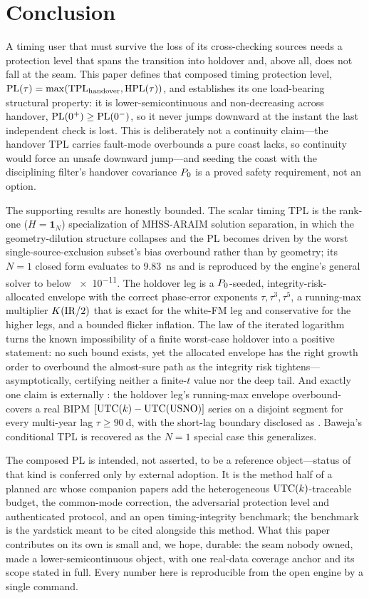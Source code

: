 \section{Conclusion}
\label{sec:conclusion}

A timing user that must survive the loss of its cross-checking sources needs a
protection level that spans the transition into holdover and, above all, does not
fall at the seam. This paper defines that composed timing protection level,
$\mathrm{PL}(\tau)=\max(\mathrm{TPL}_{\mathrm{handover}},\mathrm{HPL}(\tau))$, and establishes its one
load-bearing structural property: it is lower-semicontinuous and non-decreasing
across handover, $\mathrm{PL}(0^{+})\ge\mathrm{PL}(0^{-})$, so it never jumps downward at the
instant the last independent check is lost. This is deliberately not a continuity
claim---the handover TPL carries fault-mode overbounds a pure coast lacks, so
continuity would force an unsafe downward jump---and seeding the coast with the
disciplining filter's handover covariance $P_0$ is a proved safety requirement,
not an option.

The supporting results are honestly bounded. The scalar timing TPL is the rank-one
($H=\bm 1_N$) specialization of MHSS-ARAIM solution separation, in which the
geometry-dilution structure collapses and the PL becomes driven by the worst
single-source-exclusion subset's bias overbound rather than by geometry; its $N=1$
closed form evaluates to \SI{9.83}{\nano\second} and is reproduced by the engine's
general solver to below \num{e-11}. The holdover leg is a $P_0$-seeded,
integrity-risk-allocated envelope with the correct phase-error exponents
$\tau,\tau^{3},\tau^{5}$, a running-max multiplier $K(\mathrm{IR}/2)$ that is exact for
the white-FM leg and conservative for the higher legs, and a bounded flicker
inflation. The law of the iterated logarithm turns the known impossibility of a
finite worst-case holdover into a positive statement: no such bound exists, yet
the allocated envelope has the right growth order to overbound the almost-sure
path as the integrity risk tightens---asymptotically, certifying neither a
finite-$t$ value nor the deep tail. And exactly one claim is externally
\Validated{}: the holdover leg's running-max envelope overbound-covers a real BIPM
$[\mathrm{UTC}(k){}-\mathrm{UTC(USNO)}]$ series on a disjoint segment for every multi-year
lag $\tau\ge\SI{90}{\day}$, with the short-lag boundary disclosed as \Modelled{}.
Baweja's conditional TPL is recovered as the $N=1$ special case this generalizes.

The composed PL is intended, not asserted, to be a reference object---status of
that kind is conferred only by external adoption. It is the method half of a
planned arc whose companion papers add the heterogeneous $\mathrm{UTC}(k){}$-traceable
budget, the common-mode correction, the adversarial protection level and
authenticated protocol, and an open timing-integrity benchmark; the benchmark is
the yardstick meant to be cited alongside this method. What this paper contributes
on its own is small and, we hope, durable: the seam nobody owned, made a
lower-semicontinuous object, with one real-data coverage anchor and its scope
stated in full. Every number here is reproducible from the open engine by a single
command.
